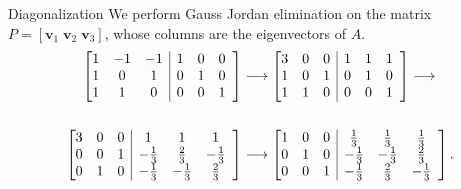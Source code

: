 \documentclass[handout]{beamer}
\def\v{\bm{v}}
\begin{document}
        \begin{frame}{Diagonalization}
                We perform Gauss Jordan elimination on the matrix $P = [\v_1\;\v_2\;\v_3]$, whose columns are the eigenvectors of $A$. \\
                \begin{align*}
                        \left[\begin{array}{@{}ccc|ccc}
                                1 & -1 & -1     & 1 & 0 & 0 \\
                                1 &  0 &  1     & 0 & 1 & 0 \\
                                1 &  1 &  0     & 0 & 0 & 1
                        \end{array}\right] &\longrightarrow
                        \left[\begin{array}{@{}ccc|ccc}
                                3 &  0 &  0     & 1 & 1 & 1 \\
                                1 &  0 &  1     & 0 & 1 & 0 \\
                                1 &  1 &  0     & 0 & 0 & 1
                        \end{array}\right] \longrightarrow \\\\
                        \left[\begin{array}{@{}ccc|ccc}
                                3 &  0 &  0     & 1 & 1 & 1 \\
                                0 &  0 &  1     & -\frac{1}{3} & \frac{2}{3} & -\frac{1}{3} \\
                                0 &  1 &  0     & -\frac{1}{3} & -\frac{1}{3} & \frac{2}{3}
                        \end{array}\right] &\longrightarrow
                        \left[\begin{array}{@{}ccc|ccc}
                                1 &  0 &  0     & \frac{1}{3} & \frac{1}{3} & \frac{1}{3} \\
                                0 &  1 &  0     & -\frac{1}{3} & -\frac{1}{3} & \frac{2}{3} \\
                                0 &  0 &  1     & -\frac{1}{3} & \frac{2}{3} & -\frac{1}{3}
                        \end{array}\right].
                \end{align*}
        \end{frame}
\end{document}
